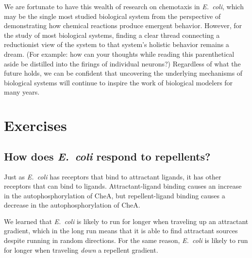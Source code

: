 We are fortunate to have this wealth of research on chemotaxis in \textit{E.~coli}, which may be the single most studied biological system from the perspective of demonstrating how chemical reactions produce emergent behavior. However, for the study of most biological systems, finding a clear thread connecting a reductionist view of the system to that system's holistic behavior remains a dream. (For example: how can your thoughts while reading this parenthetical aside be distilled into the firings of individual neurons?)  Regardless of what the future holds, we can be confident that uncovering the underlying mechanisms of biological systems will continue to inspire the work of biological modelers for many years.\\

\FloatBarrier
{}
\section{Exercises}

\subsection{How does \textit{E.~coli} respond to repellents?}

Just as \textit{E.~coli} has receptors that bind to attractant ligands, it has other receptors that can bind to  ligands. Attractant-ligand binding causes an increase in the autophosphorylation of CheA, but repellent-ligand binding causes a decrease in the autophosphorylation of CheA.\\

\begin{exercise}\end{exercise}

We learned that \textit{E.~coli} is likely to run for longer when traveling up an attractant gradient, which in the long run means that it is able to find attractant sources despite running in random directions. For the same reason, \textit{E.~coli} is likely to run for longer when traveling \textit{down} a repellent gradient.\\

\begin{exercise}\end{exercise}

